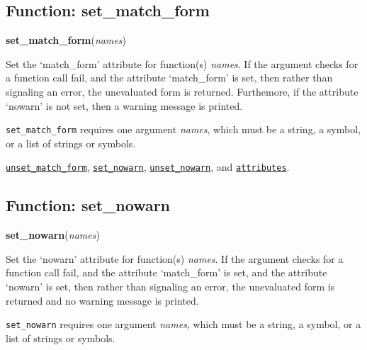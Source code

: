 \documentclass[]{article}
\begin{document}
\vspace{5 pt}


\subsection{Function: set\_match\_form\label{sec:set_match_form}}
\hypertarget{set_match_form}{}
{\bf set\_match\_form}({\it names})



\vspace{5 pt}
Set the `match\_form' attribute for function(s) {\it names}. If the argument checks for a function call fail, and the attribute `match\_form' is set, then rather than signaling an error, the unevaluated form is returned. Furthemore, if the attribute `nowarn' is not set, then a warning message is 
printed. 

\vspace{5 pt}

   {\tt set\_match\_form} requires one argument {\it names}, which must be  a string, a symbol, or a list of strings or symbols.


\vspace{5 pt}


  \hyperlink{unset_match_form}{{\tt unset\_match\_form}}, \hyperlink{set_nowarn}{{\tt set\_nowarn}}, \hyperlink{unset_nowarn}{{\tt unset\_nowarn}}, and \hyperlink{attributes}{{\tt attributes}}.

\vspace{5 pt}


\subsection{Function: set\_nowarn\label{sec:set_nowarn}}
\hypertarget{set_nowarn}{}
{\bf set\_nowarn}({\it names})



\vspace{5 pt}
Set the `nowarn' attribute for function(s) {\it names}. If the argument checks for a function call fail, and the attribute `match\_form' is set, and the attribute `nowarn' is set, then rather than signaling an error, the unevaluated form is returned and no warning message is printed. 

\vspace{5 pt}

   {\tt set\_nowarn} requires one argument {\it names}, which must be  a string, a symbol, or a list of strings or symbols.
\end{document}
